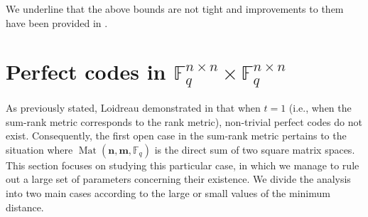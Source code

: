 \documentclass[11pt]{amsart}
\DeclareMathOperator{\Mat}{Mat}
\theoremstyle{definition}
\newcommand{\F}{{\mathbb F}}
\newcommand{\bfn}{\mathbf {n}}
\newcommand{\bfm}{\mathbf {m}}
\newcommand{\spacmn}{\Mat(\bfn,\bfm,\F_q)}
\begin{document}
We underline that the above bounds are not tight and improvements to them have been provided in \cite{sauerbier2025bounds,puchinger2022generic,ott2021bounds}.

\section{Perfect codes in \texorpdfstring{$\mathbb{F}_q^{n\times n}\times \mathbb{F}_q^{n\times n}$}{Fq(n×n) × Fq(n×n)}}\label{sec:t=2}

As previously stated, Loidreau demonstrated in \cite{loidreau2006properties} that when $t=1$ (i.e., when the sum-rank metric corresponds to the rank metric), non-trivial perfect codes do not exist. Consequently, the first open case in the sum-rank metric pertains to the situation where $\spacmn$ is the direct sum of two square matrix spaces. This section focuses on studying this particular case, in which we manage to rule out a large set of parameters concerning their existence.
We divide the analysis into two main cases according to the large or small values of the minimum distance.
\end{document}
